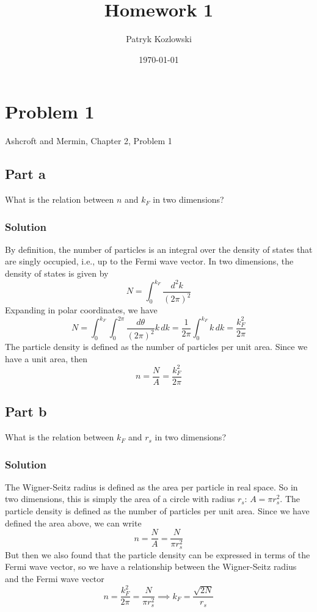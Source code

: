 \documentclass[12pt]{article}
\author{Patryk Kozlowski}
\title{Homework 1}
\date{\today}
\begin{document}
\maketitle
\section{Problem 1}
Ashcroft and Mermin, Chapter 2, Problem 1
\subsection{Part a}
What is the relation between $n$ and $k_F$ in two dimensions?
\subsubsection{Solution}
By definition, the number of particles is an integral over the density of states that are singly occupied, i.e., up to the Fermi wave vector. In two dimensions, the density of states is given by
\begin{equation}
    N = \int_{0}^{k_F} \frac{d^2k}{(2\pi)^2}
\end{equation}
Expanding in polar coordinates, we have
\begin{equation}
    N = \int_{0}^{k_F} \int_{0}^{2\pi } \frac{d\theta}{(2\pi)^2} k \, dk = \frac{1}{2\pi}\int_{0}^{k_F} k \, dk = \frac{k_F^2}{2\pi}
\end{equation}
The particle density is defined as the number of particles per unit area. Since we have a unit area, then
\begin{equation}
    n = \frac{N}{A} = \frac{k_F^2}{2\pi}
\end{equation}
\subsection{Part b}
What is the relation between $k_F$ and $r_s$ in two dimensions?
\subsubsection{Solution}
The Wigner-Seitz radius is defined as the area per particle in real space. So in two dimensions, this is simply the area of a circle with radius $r_s$: $A = \pi r_s^2$. The particle density is defined as the number of particles per unit area. Since we have defined the area above, we can write
\begin{equation}
    n = \frac{N}{A} = \frac{N}{\pi r_s^2}  
\end{equation}
But then we also found that the particle density can be expressed in terms of the Fermi wave vector, so we have a relationship between the Wigner-Seitz radius and the Fermi wave vector
\begin{equation}
    n = \frac{k_F^2}{2\pi} = \frac{N}{\pi r_s^2} \implies k_F = \frac{\sqrt{2N}}{r_s}
\end{equation}
\end{document}

